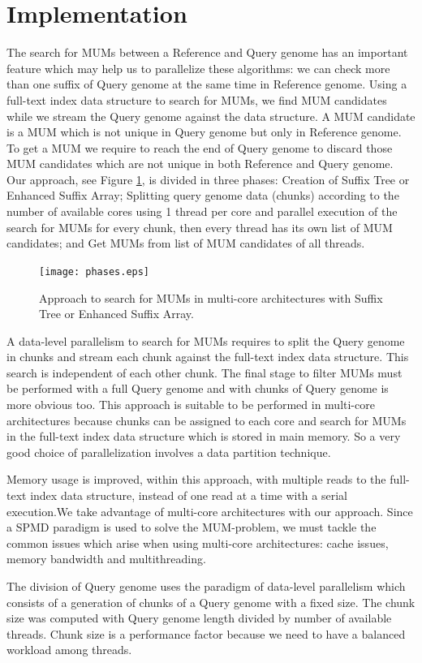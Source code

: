 \documentclass[runningheads,a5paper]{llncs}
\begin{document}
\section{Implementation}
The search for MUMs between a Reference and Query genome has an important feature which may help us to parallelize these algorithms: we can check more than one suffix of Query genome at the same time in Reference genome. Using a full-text index data structure to search for MUMs, we find MUM candidates while we stream the Query genome against the data structure. A MUM candidate is a MUM which is not unique in Query genome but only in Reference genome. To get a MUM we require to reach the end of Query genome to discard those MUM candidates which are not unique in both Reference and Query genome. Our approach, see Figure \ref{phases}, is divided in three phases: Creation of Suffix Tree or Enhanced Suffix Array; Splitting query genome data (chunks) according to the number of available cores using 1 thread per core and parallel execution of the search for MUMs for every chunk, then every thread has its own list of MUM candidates; and Get MUMs from list of MUM candidates of all threads. 
\begin{figure}
\centering 
\texttt{[image: phases.eps]}
\caption{Approach to search for MUMs in multi-core architectures with Suffix Tree or Enhanced Suffix Array.}
  \label{phases}
\end{figure}
A data-level parallelism to search for MUMs requires to split the Query genome in chunks and stream each chunk against the full-text index data structure. This search is independent of each other chunk. The final stage to filter MUMs must be performed with a full Query genome and with chunks of Query genome is more obvious too. This approach is suitable to be performed in multi-core architectures because chunks can be assigned to each core and search for MUMs in the full-text index data structure which is stored in main memory. So a very good choice of parallelization involves a data partition technique.

Memory usage is improved, within this approach, with multiple reads to the full-text index data structure, instead of one read at a time with a serial execution.We take advantage of multi-core architectures with our approach. Since a SPMD paradigm is used to solve the MUM-problem, we must tackle the common issues which arise when using multi-core architectures: cache issues, memory bandwidth and multithreading.

The division of Query genome uses the paradigm of data-level parallelism which consists of a generation of chunks of a Query genome with a fixed size. The chunk size was computed with Query genome length divided by number of available threads. Chunk size is a performance factor because we need to have a balanced workload among threads.
\end{document}
